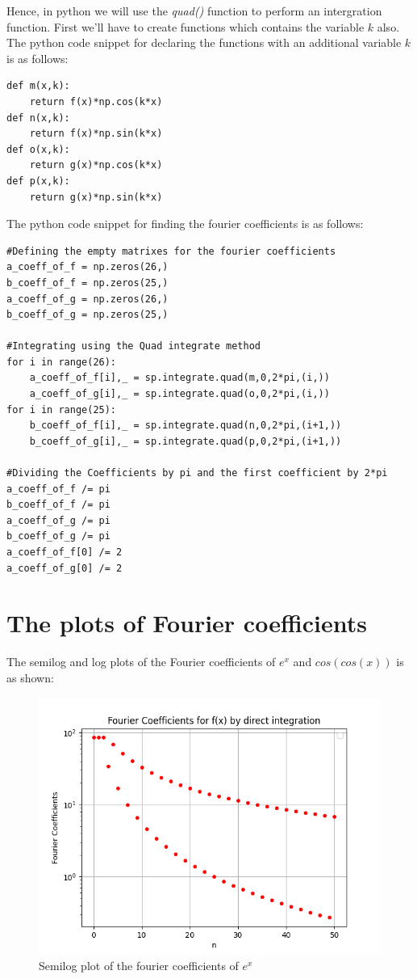 \documentclass[11pt, a4paper]{article}
\begin{document}
Hence, in python we will use the \textit{quad()} function to perform an intergration function. First we'll have to create functions which contains the variable $k$ also. The python code snippet for declaring the functions with an additional variable $k$ is as follows:
\begin{verbatim}
def m(x,k):        
    return f(x)*np.cos(k*x)
def n(x,k):
    return f(x)*np.sin(k*x)
def o(x,k):
    return g(x)*np.cos(k*x)
def p(x,k):
    return g(x)*np.sin(k*x)	

\end{verbatim}
The python code snippet for finding the fourier coefficients is as follows:
\begin{verbatim}
#Defining the empty matrixes for the fourier coefficients 
a_coeff_of_f = np.zeros(26,)
b_coeff_of_f = np.zeros(25,)
a_coeff_of_g = np.zeros(26,)
b_coeff_of_g = np.zeros(25,)

#Integrating using the Quad integrate method
for i in range(26):
    a_coeff_of_f[i],_ = sp.integrate.quad(m,0,2*pi,(i,))
    a_coeff_of_g[i],_ = sp.integrate.quad(o,0,2*pi,(i,))
for i in range(25):
    b_coeff_of_f[i],_ = sp.integrate.quad(n,0,2*pi,(i+1,))
    b_coeff_of_g[i],_ = sp.integrate.quad(p,0,2*pi,(i+1,)) 

#Dividing the Coefficients by pi and the first coefficient by 2*pi
a_coeff_of_f /= pi
b_coeff_of_f /= pi
a_coeff_of_g /= pi
b_coeff_of_g /= pi
a_coeff_of_f[0] /= 2
a_coeff_of_g[0] /= 2
\end{verbatim}
   
\section{The plots of Fourier coefficients}
The semilog and log plots of the Fourier coefficients of  $e^{x}$ and $cos(cos(x))$ is as shown:
	\begin{figure}[!tbh]
   	\centering
   	\includegraphics[scale=0.6]{Figure4.png}   
   	\caption{Semilog plot of the fourier coefficients of $e^{x}$}
   	\label{fig:sample}
   \end{figure} 
\end{document}

